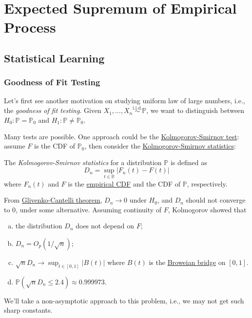 \chapter{Expected Supremum of Empirical Process}
\section{Statistical Learning}
\subsection{Goodness of Fit Testing}
Let's first see another motivation on studying uniform law of large numbers, i.e., the \emph{goodness of fit testing}. Given \(X_1, \dots , X_n \overset{\text{i.i.d.}}{\sim } \mathbb{P} \), we want to distinguish between \(H_0 \colon \mathbb{P} = \mathbb{P} _0\) and \(H_1\colon \mathbb{P} \neq \mathbb{P} _0\).

Many tests are possible. One approach could be the \href{https://en.wikipedia.org/wiki/Kolmogorov-Smirnov_test}{Kolmogorov-Smirnov test}: assume \(F\) is the CDF of \(\mathbb{P} _0\), then consider the \hyperref[def:Kolmogorov-Smirnov-statistics]{Kolmogorov-Smirnov statistics}:

\begin{definition}\label{def:Kolmogorov-Smirnov-statistics}
	The \emph{Kolmogorov-Smirnov statistics} for a distribution \(\mathbb{P} \) is defined as
	\[
		D_n = \sup _{t\in \mathbb{R} } \vert F_n(t) - F(t) \vert
	\]
	where \(F_n(t)\) and \(F\) is the \hyperref[def:empirical-CDF]{empirical CDF} and the CDF of \(\mathbb{P} \), respectively.
\end{definition}

From \href{https://en.wikipedia.org/wiki/Glivenko-Cantelli_theorem}{Glivenko-Cantelli theorem}, \(D_n \to 0\) under \(H_0\), and \(D_n\) should not converge to \(0\), under some alternative. Assuming continuity of \(F\), Kolmogorov showed that
\begin{enumerate}[(a)]
	\item the distribution \(D_n\) does not depend on \(F\);
	\item \(D_n = O_p(1 / \sqrt{n} )\);
	\item \(\sqrt{n} D_n \to \sup _{t\in [0, 1]} \vert B(t) \vert \) where \(B(t)\) is the \href{https://en.wikipedia.org/wiki/Brownian_bridge}{Broweian bridge} on \([0, 1]\).
	\item \(\mathbb{P} (\sqrt{n}D_n  \leq 2.4) \approx 0.999973\).
\end{enumerate}
We'll take a non-asymptotic approach to this problem, i.e., we may not get such sharp constants.

